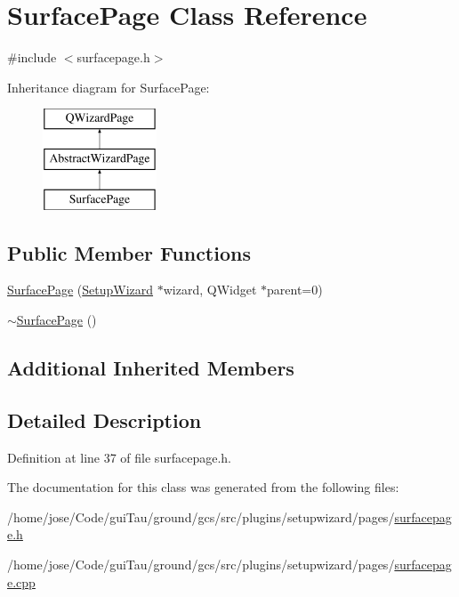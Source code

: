 \hypertarget{class_surface_page}{\section{Surface\-Page Class Reference}
\label{class_surface_page}
}


{\ttfamily \#include $<$surfacepage.\-h$>$}

Inheritance diagram for Surface\-Page\-:\begin{figure}[H]
\begin{center}
\leavevmode
\includegraphics[height=3.000000cm]{class_surface_page}
\end{center}
\end{figure}
\subsection*{Public Member Functions}
\begin{DoxyCompactItemize}
\item 
\hyperlink{group___surface_page_gabaf6a042908dc3e52b5e4f2c59c32e3a}{Surface\-Page} (\hyperlink{class_setup_wizard}{Setup\-Wizard} $\ast$wizard, Q\-Widget $\ast$parent=0)
\item 
\hyperlink{group___surface_page_ga5a8e3eacbff6da1ddd215db6456358c8}{$\sim$\-Surface\-Page} ()
\end{DoxyCompactItemize}
\subsection*{Additional Inherited Members}


\subsection{Detailed Description}


Definition at line 37 of file surfacepage.\-h.



The documentation for this class was generated from the following files\-:\begin{DoxyCompactItemize}
\item 
/home/jose/\-Code/gui\-Tau/ground/gcs/src/plugins/setupwizard/pages/\hyperlink{surfacepage_8h}{surfacepage.\-h}\item 
/home/jose/\-Code/gui\-Tau/ground/gcs/src/plugins/setupwizard/pages/\hyperlink{surfacepage_8cpp}{surfacepage.\-cpp}\end{DoxyCompactItemize}
